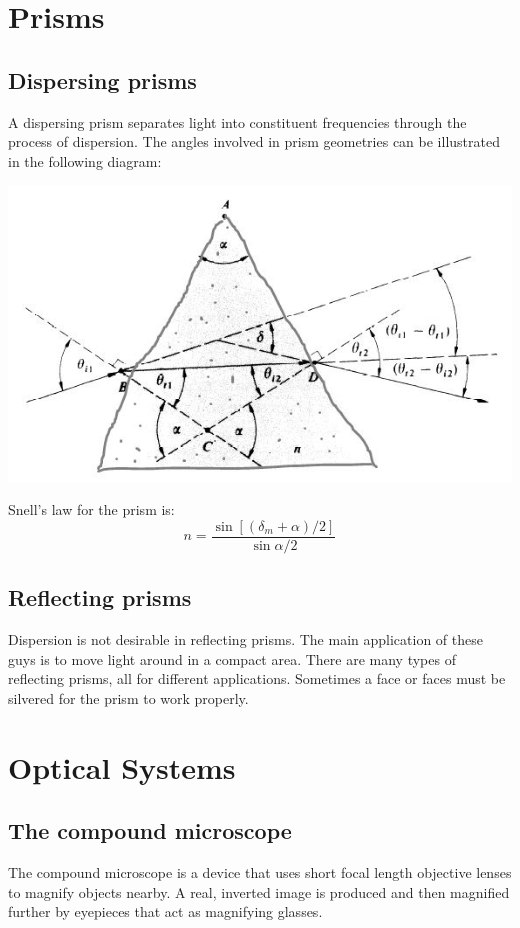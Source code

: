 \documentclass[12pt]{report}
\begin{document}
\section{Prisms}
\subsection{Dispersing prisms}
A dispersing prism separates light into constituent frequencies through the process of dispersion. The angles involved in prism geometries can be illustrated in the following diagram:

\includegraphics[scale=.5]{DispersingPrism.jpg}

Snell's law for the prism is:
\begin{equation}
n = \frac{\sin [(\delta_m+\alpha)/2]}{\sin \alpha/2}
\end{equation}
\subsection{Reflecting prisms}
Dispersion is not desirable in reflecting prisms. The main application of these guys is to move light around in a compact area. There are many types of reflecting prisms, all for different applications. Sometimes a face or faces must be silvered for the prism to work properly. 

\section{Optical Systems}

\subsection{The compound microscope}
The compound microscope is a device that uses short focal length objective lenses to magnify objects nearby. A real, inverted image is produced and then magnified further by eyepieces that act as magnifying glasses. 
\end{document}

